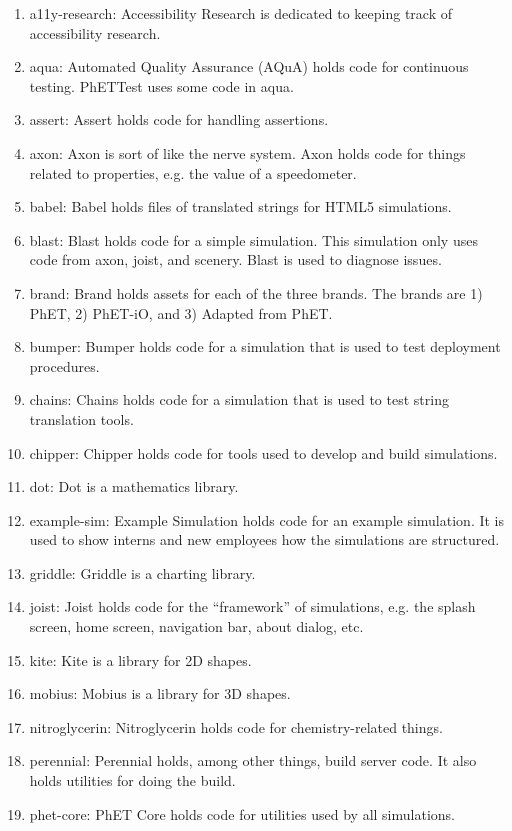 \documentclass[titlepage]{article}
\begin{document}
		\begin{enumerate}
			\item a11y-research: Accessibility Research is dedicated to keeping track of accessibility research.
			\item aqua: Automated Quality Assurance (AQuA) holds code for continuous testing. PhETTest uses some code in aqua.
			\item assert: Assert holds code for handling assertions.
			\item axon: Axon is sort of like the nerve system. Axon holds code for things related to properties, e.g. the value of a speedometer.
			\item babel: Babel holds files of translated strings for HTML5 simulations.
			\item blast: Blast holds code for a simple simulation. This simulation only uses code from axon, joist, and scenery. Blast is used to diagnose issues.
			\item brand: Brand holds assets for each of the three brands. The brands are 1) PhET, 2) PhET-iO, and 3) Adapted from PhET.
			\item bumper: Bumper holds code for a simulation that is used to test deployment procedures.
			\item chains: Chains holds code for a simulation that is used to test string translation tools.
			\item chipper: Chipper holds code for tools used to develop and build simulations.
			\item dot: Dot is a mathematics library.
			\item example-sim: Example Simulation holds code for an example simulation. It is used to show interns and new employees how the simulations are structured.
			\item griddle: Griddle is a charting library.
			\item joist: Joist holds code for the ``framework'' of simulations, e.g. the splash screen, home screen, navigation bar, about dialog, etc.
			\item kite: Kite is a library for 2D shapes.
			\item mobius: Mobius is a library for 3D shapes.
			\item nitroglycerin: Nitroglycerin holds code for chemistry-related things.
			\item perennial: Perennial holds, among other things, build server code. It also holds utilities for doing the build.
			\item phet-core: PhET Core holds code for utilities used by all simulations.

\end{enumerate}
\end{document}
